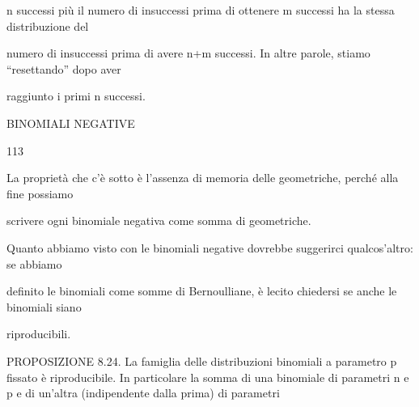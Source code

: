 \documentclass[a4paper,portrait,12pt]{article}
\begin{document}
\begin{flushleft}
n successi più il numero di insuccessi prima di ottenere m successi ha la stessa distribuzione del
\end{flushleft}


\begin{flushleft}
numero di insuccessi prima di avere n+m successi. In altre parole, stiamo {``}resettando'' dopo aver
\end{flushleft}


\begin{flushleft}
raggiunto i primi n successi.
\end{flushleft}





\begin{flushleft}
 BINOMIALI NEGATIVE
\end{flushleft}





113





\begin{flushleft}
La propriet\`{a} che c'\`{e} sotto \`{e} l'assenza di memoria delle geometriche, perch\'{e} alla fine possiamo
\end{flushleft}


\begin{flushleft}
scrivere ogni binomiale negativa come somma di geometriche.
\end{flushleft}


\begin{flushleft}
Quanto abbiamo visto con le binomiali negative dovrebbe suggerirci qualcos'altro: se abbiamo
\end{flushleft}


\begin{flushleft}
definito le binomiali come somme di Bernoulliane, \`{e} lecito chiedersi se anche le binomiali siano
\end{flushleft}


\begin{flushleft}
riproducibili.
\end{flushleft}


\begin{flushleft}
PROPOSIZIONE 8.24. La famiglia delle distribuzioni binomiali a parametro p fissato \`{e} riproducibile. In particolare la somma di una binomiale di parametri n e p e di un'altra (indipendente dalla prima) di parametri
\end{flushleft}
\end{document}
